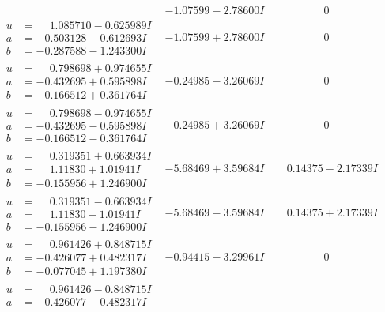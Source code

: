 \documentclass[1p]{elsarticle_modified}
\theoremstyle{definition}
\begin{document}
$$\begin{array}{c|c|c}
 & -1.07599 - 2.78600 I & \phantom{-0.000000 } 0 \\ \hline\begin{aligned}
u &= \phantom{-}1.085710 - 0.625989 I \\
a &= -0.503128 - 0.612693 I \\
b &= -0.287588 - 1.243300 I\end{aligned}
 & -1.07599 + 2.78600 I & \phantom{-0.000000 } 0 \\ \hline\begin{aligned}
u &= \phantom{-}0.798698 + 0.974655 I \\
a &= -0.432695 + 0.595898 I \\
b &= -0.166512 + 0.361764 I\end{aligned}
 & -0.24985 - 3.26069 I & \phantom{-0.000000 } 0 \\ \hline\begin{aligned}
u &= \phantom{-}0.798698 - 0.974655 I \\
a &= -0.432695 - 0.595898 I \\
b &= -0.166512 - 0.361764 I\end{aligned}
 & -0.24985 + 3.26069 I & \phantom{-0.000000 } 0 \\ \hline\begin{aligned}
u &= \phantom{-}0.319351 + 0.663934 I \\
a &= \phantom{-}1.11830 + 1.01941 I \\
b &= -0.155956 + 1.246900 I\end{aligned}
 & -5.68469 + 3.59684 I & \phantom{-}0.14375 - 2.17339 I \\ \hline\begin{aligned}
u &= \phantom{-}0.319351 - 0.663934 I \\
a &= \phantom{-}1.11830 - 1.01941 I \\
b &= -0.155956 - 1.246900 I\end{aligned}
 & -5.68469 - 3.59684 I & \phantom{-}0.14375 + 2.17339 I \\ \hline\begin{aligned}
u &= \phantom{-}0.961426 + 0.848715 I \\
a &= -0.426077 + 0.482317 I \\
b &= -0.077045 + 1.197380 I\end{aligned}
 & -0.94415 - 3.29961 I & \phantom{-0.000000 } 0 \\ \hline\begin{aligned}
u &= \phantom{-}0.961426 - 0.848715 I \\
a &= -0.426077 - 0.482317 I \\

\end{aligned}
\end{array}$$
\end{document}
